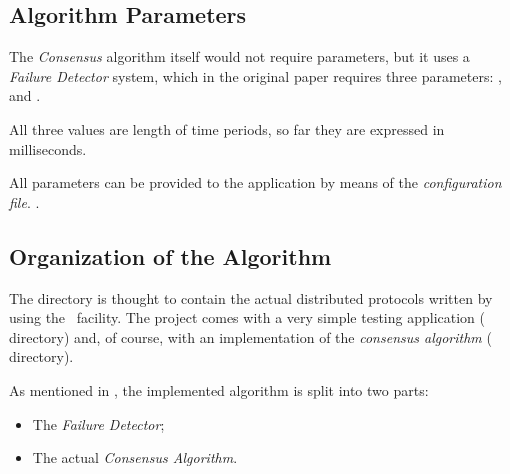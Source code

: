 \subsection{Algorithm Parameters} \label{sub:ConsParams}

The \emph{Consensus} algorithm itself would not require parameters, but it
uses a \emph{Failure Detector} system, which in the original
paper\cite{bib:FD} requires three parameters: ,
 and .

All three values are length of time periods, so far they are expressed
in milliseconds.
 
All parameters can be provided to the application by means of the
\emph{configuration file}. .


\subsection{Organization of the Algorithm}

The  directory is thought to contain the actual
distributed protocols written by using the \YUNA\ facility. The project
comes with a very simple testing application (
directory) and, of course, with an implementation of the \emph{consensus
algorithm} ( directory).

As mentioned in , the implemented
algorithm is split into two parts:
\begin{itemize}

    \item   The \emph{Failure Detector};
    \item   The actual \emph{Consensus Algorithm}.

\end{itemize}

